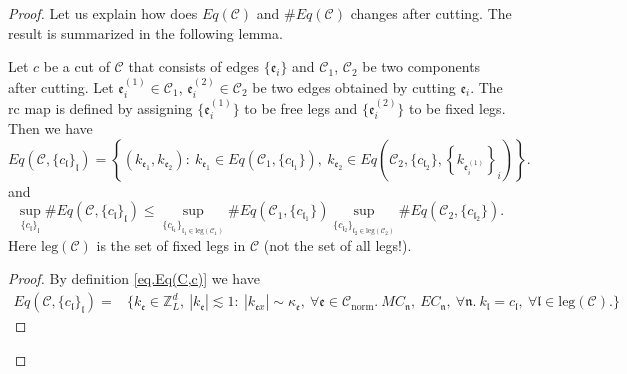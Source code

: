 \begin{proof}
Let us explain how does $Eq(\mathcal{C})$ and $\#Eq(\mathcal{C})$ changes after cutting. The result is summarized in the following lemma.
\begin{lem}\label{lem.Eq(C)cutting}
Let $c$ be a cut of $\mathcal{C}$ that consists of edges $\{\mathfrak{e}_{i}\}$ and $\mathcal{C}_1$, $\mathcal{C}_2$ be two components after cutting. Let $\mathfrak{e}_{i}^{(1)}\in \mathcal{C}_1$, $\mathfrak{e}_{i}^{(2)}\in \mathcal{C}_2$ be two edges obtained by cutting $\mathfrak{e}_{i}$. The $\text{rc}$ map is defined by assigning $\{\mathfrak{e}_{i}^{(1)}\}$ to be free legs and $\{\mathfrak{e}_{i}^{(2)}\}$ to be fixed legs. Then we have 
\begin{equation}\label{eq.Eq(C)cutting}
    Eq(\mathcal{C},\{c_{\mathfrak{l}}\}_{\mathfrak{l}})=\left\{(k_{\mathfrak{e}_1},k_{\mathfrak{e}_{2}}):\ k_{\mathfrak{e}_1}\in Eq(\mathcal{C}_1,\{c_{\mathfrak{l}_1}\}),\  k_{\mathfrak{e}_{2}}\in Eq\left(\mathcal{C}_{2}, \{c_{\mathfrak{l}_2}\}, \left\{k_{\mathfrak{e}_{i}^{(1)}}\right\}_{i}\right)\right\}.
\end{equation}
and
\begin{equation}\label{eq.Eq(C)cuttingcounting}
    \sup_{\{c_{\mathfrak{l}}\}_{\mathfrak{l}}}\#Eq(\mathcal{C},\{c_{\mathfrak{l}}\}_{\mathfrak{l}})\le
    \sup_{\{c_{\mathfrak{l}_1}\}_{\mathfrak{l}_1\in \text{leg}(\mathcal{C}_1)} } \# Eq(\mathcal{C}_1,\{c_{\mathfrak{l}_1}\}) \sup_{\{c_{\mathfrak{l}_2}\}_{\mathfrak{l}_2\in \text{leg}(\mathcal{C}_2)} }\# Eq(\mathcal{C}_{2}, \{c_{\mathfrak{l}_2}\}).
\end{equation}
Here $\text{leg}(\mathcal{C})$ is the set of fixed legs in $\mathcal{C}$ (not the set of all legs!).
\end{lem}
\begin{proof}
By definition \eqref{eq.Eq(C,c)} we have
\begin{equation}
\begin{split}
    Eq(\mathcal{C},\{c_{\mathfrak{l}}\}_{\mathfrak{l}})=&\{k_{\mathfrak{e}}\in \mathbb{Z}^d_L,\ |k_{\mathfrak{e}}|\lesssim 1:\  |k_{\mathfrak{e}x}| \sim \kappa_{\mathfrak{e}},\ \forall \mathfrak{e}\in \mathcal{C}_{\text{norm}}.\ MC_{\mathfrak{n}},\  EC_{\mathfrak{n}},\ \forall \mathfrak{n}.\  k_{\mathfrak{l}}=c_{\mathfrak{l}},\ \forall \mathfrak{l}\in \text{leg}(\mathcal{C}).\} 

\end{split}
\end{equation}
\end{proof}
\end{proof}
